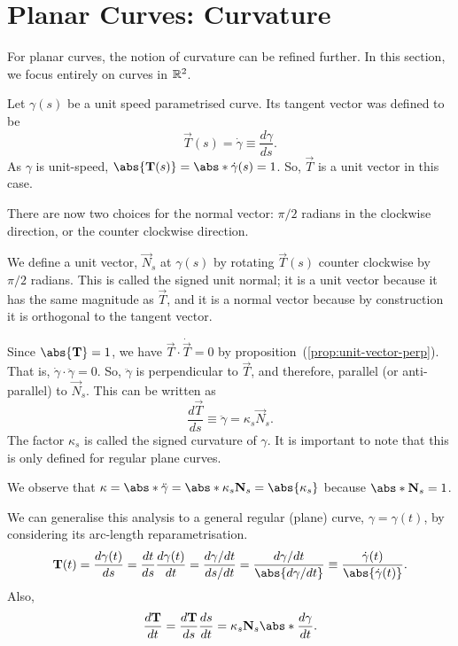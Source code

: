 \documentclass[11pt]{penrose}
\newcommand{\vT}{\vec{T}}
\newcommand{\vN}{\vec{N}}
\newcommand{\keyword}[1]{\textsf{#1}}
\begin{document}
\section{Planar Curves: Curvature}

For planar curves, the notion of curvature can be refined further. In this section, we focus entirely on curves in $\mathbb{R}^2$.

Let $\gamma(s)$ be a unit speed parametrised curve. Its tangent vector was defined to be
\begin{equation}
    \vT(s) = \dot{\gamma} \equiv \frac{d\gamma}{ds}.
    \label{eq:tangent-dfn}
\end{equation}
As $\gamma$ is unit-speed, $\abs{\vT(s)} = \abs*{\dot{\gamma}(s)} = 1$. So, $\vT$ is a unit vector in this case.

There are now two choices for the \keyword{normal} vector: $\pi/2$ radians in the clockwise direction, or the counter clockwise direction.

We define a unit vector, $\vN_s$ at $\gamma(s)$ by rotating $\vT(s)$ counter clockwise by $\pi/2$ radians. This is called the \keyword{signed unit normal}; it is a unit vector because it has the same magnitude as $\vT$, and it is a normal vector because by construction it is orthogonal to the tangent vector.

Since $\abs{\vT} = 1$, we have $\vT \cdot \dot{\vT} = 0$ by proposition~(\ref{prop:unit-vector-perp}). That is, $\dot{\gamma} \cdot \ddot{\gamma} = 0$. So, $\ddot{\gamma}$ is perpendicular to $\vT$, and therefore, parallel (or anti-parallel) to $\vN_s$. This can be written as
\begin{equation}
    \frac{d\vT}{ds} \equiv \ddot{\gamma} = \kappa_s \vN_s.
\end{equation}
The factor $\kappa_s$ is called the \keyword{signed curvature} of $\gamma$. It is important to note that this is only defined for regular plane curves.

We observe that $\kappa = \abs*{\ddot{\gamma}} = \abs*{\kappa_s \vN_s} = \abs{\kappa_s}$ because $\abs*{\vN_s} = 1$.


We can generalise this analysis to a general regular (plane) curve, $\gamma = \gamma(t)$, by considering its arc-length reparametrisation.
\begin{equation}
    \vT(t)
    = \frac{d\gamma(t)}{ds}
    = \frac{dt}{ds} \frac{d\gamma(t)}{dt}
    = \frac{d\gamma/dt}{ds/dt}
    = \frac{d\gamma/dt}{\abs{d\gamma/dt}}
    \equiv \frac{\dot{\gamma}(t)}{\abs{\dot{\gamma}(t)}}.
\end{equation}
Also,
\begin{equation*}
    \frac{d\vT}{dt}
    = \frac{d\vT}{ds} \frac{ds}{dt}
    = \kappa_s \vN_s \abs*{\frac{d\gamma}{dt}}.
\end{equation*}
\end{document}
